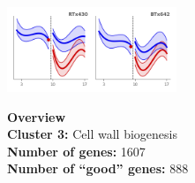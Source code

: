 \begin{multicols}{2}
\includegraphics[width=2in]{figures/clusters/root_Postflowering_2.png}
\columnbreak

\noindent \textbf{Overview}\\\textbf{Cluster 3:} Cell wall biogenesis \\
\textbf{Number of genes:} 1607 \\
\textbf{Number of ``good'' genes:} 888 \\
\end{multicols}

